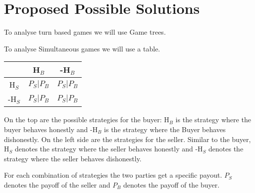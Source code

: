 \documentclass{cacthesis}
\begin{document}
\chapter{Proposed Possible Solutions}
To analyse turn based games we will use Game trees. 

To analyse Simultaneous games we will use a table.
\begin{center}
\begin{tabular}{ c||c|c| }
& H$_B$ & -H$_B$  \\
\hline
\hline
H$_S$ & $P_S | P_B$ & $P_S | P_B$ \\
\hline
-H$_S$ & $P_S | P_B$ & $P_S | P_B$ \\ 
\hline
\end{tabular}
\end{center}

 On the top are the possible strategies for the buyer: H$_B$ is the strategy where the buyer behaves honestly and -H$_B$ is the strategy where the Buyer behaves dishonestly.\newline
On the left side are the strategies for the seller. Similar to the buyer, H$_S$ denotes the strategy where the seller behaves honestly and -H$_S$ denotes the strategy where the seller behaves dishonestly.\newline

For each combination of strategies the two parties get a specific payout. $P_S$ denotes the payoff of the seller and $P_B$ denotes the payoff of the buyer.
\end{document}
